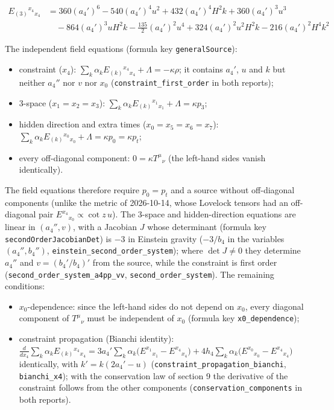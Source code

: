 \documentclass[11pt]{article}
\begin{document}
\[
\begin{aligned}
E_{(3)}{}^{x_4}{}_{x_4} &= 360 (a_4')^{6} - 540 (a_4')^{4} u^{2} + 432 (a_4')^{4} H^{2} k + 360 (a_4')^{3} u^{3} \\
&\quad - 864 (a_4')^{3} u H^{2} k - \tfrac{135}{2} (a_4')^{2} u^{4} + 324 (a_4')^{2} u^{2} H^{2} k - 216 (a_4')^{2} H^{4} k^{2}
\end{aligned}
\]

The independent field equations (formula key \texttt{generalS\allowbreak{}ource}):

\begin{itemize}
\item constraint ($x_4$): $\sum_k\alpha_k E_{(k)}{}^{x_4}{}_{x_4} + \Lambda = -\kappa\rho$; it contains $a_4'$, $u$ and $k$ but neither $a_4''$ nor $v$ nor $x_0$ (\texttt{constrai\allowbreak{}nt\_first\allowbreak{}\_order} in both reports);
\item 3-space ($x_1 = x_2 = x_3$): $\sum_k\alpha_k E_{(k)}{}^{x_1}{}_{x_1} + \Lambda = \kappa p_3$;
\item hidden direction and extra times ($x_0 = x_5 = x_6 = x_7$): $\sum_k\alpha_k E_{(k)}{}^{x_0}{}_{x_0} + \Lambda = \kappa p_0 = \kappa p_t$;
\item every off-diagonal component: $0 = \kappa T^\mu{}_\nu$ (the left-hand sides vanish identically).
\end{itemize}

The field equations therefore require $p_0 = p_t$ and a source without off-diagonal components (unlike the metric of 2026-10-14, whose Lovelock tensors had an off-diagonal pair $E^{x_4}{}_{x_0} \propto \cot z\,u$). The 3-space and hidden-direction equations are linear in $(a_4'', v)$, with a Jacobian $J$ whose determinant (formula key \texttt{secondOr\allowbreak{}derJacob\allowbreak{}ianDet}) is $-3$ in Einstein gravity ($-3/b_4$ in the variables $(a_4'', b_4'')$, \texttt{einstein\allowbreak{}\_second\_\allowbreak{}order\_sy\allowbreak{}stem}); where $\det J \neq 0$ they determine $a_4''$ and $v = (b_4'/b_4)'$ from the source, while the constraint is first order (\texttt{second\_o\allowbreak{}rder\_sys\allowbreak{}tem\_a4pp\allowbreak{}\_vv}, \texttt{second\_o\allowbreak{}rder\_sys\allowbreak{}tem}). The remaining conditions:

\begin{itemize}
\item $x_0$-dependence: since the left-hand sides do not depend on $x_0$, every diagonal component of $T^\mu{}_\nu$ must be independent of $x_0$ (formula key \texttt{x0\_depen\allowbreak{}dence});
\item constraint propagation (Bianchi identity): $\frac{d}{dx_4}\sum_k\alpha_k E_{(k)}{}^{x_4}{}_{x_4} = 3a_4'\sum_k\alpha_k\big(E^{x_1}{}_{x_1} - E^{x_4}{}_{x_4}\big) + 4h_4\sum_k\alpha_k\big(E^{x_0}{}_{x_0} - E^{x_4}{}_{x_4}\big)$ identically, with $k' = k(2a_4' - u)$ (\texttt{constrai\allowbreak{}nt\_propa\allowbreak{}gation\_b\allowbreak{}ianchi}, \texttt{bianchi\_\allowbreak{}x4}); with the conservation law of section 9 the derivative of the constraint follows from the other components (\texttt{conserva\allowbreak{}tion\_com\allowbreak{}ponents} in both reports).
\end{itemize}
\end{document}
